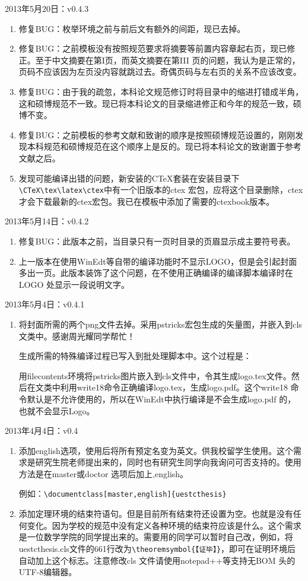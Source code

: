 \noindent
2013年5月20日：v0.4.3
\begin{enumerate}
\item 修复BUG：枚举环境之前与前后文有额外的间距，现已去掉。
\item 修复BUG：之前模板没有按照规范要求将摘要等前置内容章起右页，现已修正。至于中文摘要在第I页，而英文摘要在第III 页的问题，我认为是正常的，页码不应该因为左页没内容就跳过去。奇偶页码与左右页的关系不应该改变。
\item 修复BUG：由于我的疏忽，本科论文规范修订时将目录中的缩进打错成半角，这和硕博规范不一致。现已将本科论文的目录缩进修正和今年的规范一致，硕博不变。
\item 修复BUG：之前模板的参考文献和致谢的顺序是按照硕博规范设置的，刚刚发现本科规范和硕博规范在这个顺序上是反的。现已将本科论文的致谢置于参考文献之后。
\item 发现可能编译出错的问题，新安装的CTeX套装在安装目录下\verb|\CTeX\tex\latex\ctex|中有一个旧版本的ctex 宏包，应将这个目录删除，ctex 才会下载最新的ctex宏包。我已在模板中添加了需要的ctexbook版本。
\end{enumerate}

\noindent
2013年5月14日：v0.4.2
\begin{enumerate}
\item 修复BUG：此版本之前，当目录只有一页时目录的页眉显示成主要符号表。
\item 上一版本在使用WinEdt等自带的编译功能时不显示LOGO，但是会引起封面多出一页。此版本装饰了这个问题，在不使用正确编译的编译脚本编译时在LOGO 处显示一段说明文字。

\end{enumerate}

\noindent
2013年5月4日：v0.4.1
\begin{enumerate}
\item 将封面所需的两个png文件去掉。采用pstricks宏包生成的矢量图，并嵌入到cls文类中。感谢周光耀同学帮忙！

生成所需的特殊编译过程已写入到批处理脚本中。这个过程是：

用filecontents环境将pstricks图片嵌入到cls文件中，令其生成logo.tex文件。然后在文类中利用write18命令正确编译logo.tex，生成logo.pdf。这个write18 命令默认是不允许使用的，所以在WinEdt中执行编译是不会生成logo.pdf 的，也就不会显示Logo。

\end{enumerate}

\noindent
2013年4月4日：v0.4
\begin{enumerate}
\item 添加english选项，使用后将所有预定名变为英文。供我校留学生使用。这个需求是研究生院老师提出来的，同时也有研究生同学向我询问可否支持的。使用方法是在master或doctor 选项后加上,english。

    例如：\verb|\documentclass[master,english]{uestcthesis}|
\item 添加定理环境的结束符语句。但是目前所有结束符还设置为空。也就是没有任何变化。因为学校的规范中没有定义各种环境的结束符应该是什么。这个需求是一位数学学院的同学提出来的。需要用的同学可以暂时自己改，例如，将uestcthesis.cls文件的661行改为\verb|\theoremsymbol{【证毕】}|，即可在证明环境后自动加上这个标志。注意修改cls 文件请使用notepad++等支持无BOM 头的UTF-8编辑器。
\end{enumerate}

